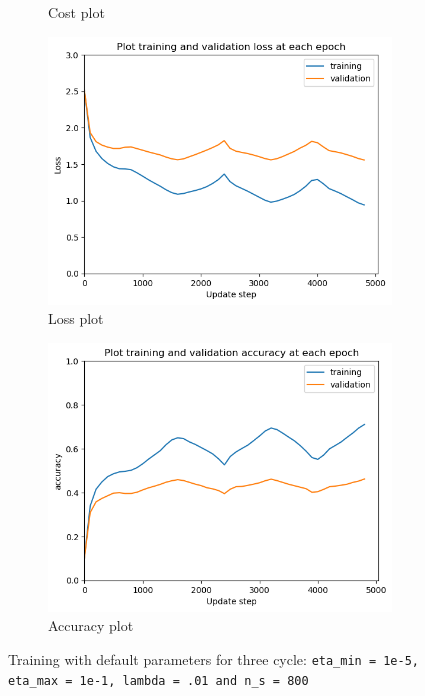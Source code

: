 \documentclass[12pt]{article}
\newenvironment{question}[2][Question]{\begin{trivlist}
\kern10pt
\item[\hskip \labelsep {\bfseries #1}\hskip \labelsep {\bfseries #2.}]}{\end{trivlist}}
\begin{document}
\begin{question}{2.ii}
\begin{figure}[!htb]
\begin{subfigure}[b]{0.32\textwidth}
        \caption{Cost plot}
    \end{subfigure}
    \hfill
    \begin{subfigure}[b]{0.32\textwidth}
        \includegraphics[width=\linewidth]{f4_loss_plt.png}
        \caption{Loss plot}
    \end{subfigure}\hfill
    \begin{subfigure}[b]{0.32\textwidth}%
        \includegraphics[width=\linewidth]{f4_acc_plt.png}
        \caption{Accuracy plot}
    \end{subfigure}
    \caption{
        Training with default parameters for three cycle:
        \texttt{eta\_min = 1e-5, eta\_max = 1e-1,  lambda = .01 and n\_s = 800}
    }
    \label{fig:replicate_f4}
\end{figure}
\end{question}
\end{document}
